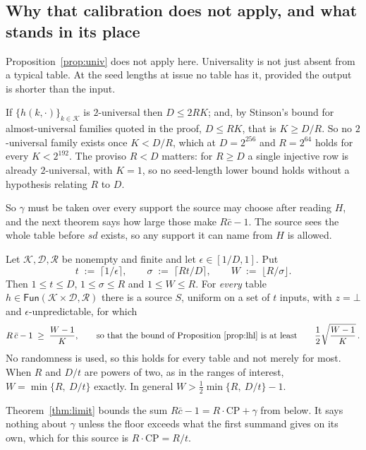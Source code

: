 \documentclass{aicr-solution}
\newcommand{\Fun}{\mathsf{Fun}}
\newcommand{\sd}{\mathit{sd}}
\newcommand{\calK}{\mathcal{K}}
\newcommand{\calD}{\mathcal{D}}
\newcommand{\calR}{\mathcal{R}}
\newcommand{\CP}{\mathrm{CP}}
\begin{document}
\subsection*{Why that calibration does not apply, and what stands in its place}

Proposition~\ref{prop:univ} does not apply here. Universality is not just absent from a typical
table. At the seed lengths at issue no table has it, provided the output is shorter than the
input.

\begin{proposition}\label{prop:nouniv}
If $\{h(k,\cdot)\}_{k\in\calK}$ is $2$-universal then $D \le 2RK$; and, by Stinson's bound for
almost-universal families quoted in the proof, $D \le RK$, that is $K \ge D/R$. So no
$2$-universal family exists once $K < D/R$, which at $D = 2^{256}$ and $R = 2^{64}$ holds for every
$K < 2^{192}$. The proviso $R < D$ matters: for $R \ge D$ a single injective row is already
$2$-universal, with $K = 1$, so no seed-length lower bound holds without a hypothesis relating $R$
to $D$.
\end{proposition}

So $\gamma$ must be taken over every support the source may choose after reading $H$, and the next
theorem says how large those make $R\bar c - 1$. The source sees the whole table before $\sd$
exists, so any support it can name from $H$ is allowed.

\begin{theorem}\label{thm:limit}
Let $\calK, \calD, \calR$ be nonempty and finite and let $\epsilon \in [1/D, 1]$. Put
\[
  t \;:=\; \lceil 1/\epsilon \rceil , \qquad
  \sigma \;:=\; \lceil Rt/D \rceil , \qquad
  W \;:=\; \lfloor R/\sigma \rfloor .
\]
Then $1 \le t \le D$, $1 \le \sigma \le R$ and $1 \le W \le R$. For \emph{every} table
$h \in \Fun(\calK\times\calD,\calR)$ there is a source $S$, uniform on a set of $t$ inputs, with
$z = \bot$ and $\epsilon$-unpredictable, for which
\[
  R\,\bar c - 1 \;\ge\; \frac{W - 1}{K} ,
  \qquad\text{so that the bound of Proposition~\ref{prop:lhl} is at least}\qquad
  \frac12\sqrt{\frac{W-1}{K}} \, .
\]
No randomness is used, so this holds for every table and not merely for most. When $R$ and $D/t$
are powers of two, as in the ranges of interest, $W = \min\{R,\ D/t\}$ exactly. In general
$W > \tfrac12\min\{R,\ D/t\} - 1$.
\end{theorem}

Theorem~\ref{thm:limit} bounds the sum $R\bar c - 1 = R\cdot\CP + \gamma$ from below. It says
nothing about $\gamma$ unless the floor exceeds what the first summand gives on its own, which for
this source is $R\cdot\CP = R/t$.
\end{document}
